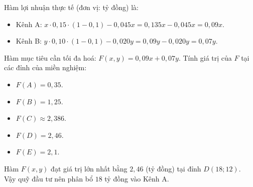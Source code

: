 \begin{ex}
{\begin{center}
\begin{tikzpicture}[line join=round, line cap=round, >=stealth, scale=0.2222]
		\end{tikzpicture}
		\end{center}
		Hàm lợi nhuận thực tế (đơn vị: tỷ đồng) là:
		\begin{itemize}
			\item Kênh A: $x \cdot 0{,}15 \cdot (1 - 0{,}1) - 0{,}045x = 0{,}135x - 0{,}045x = 0{,}09x$.
			\item Kênh B: $y \cdot 0{,}10 \cdot (1 - 0{,}1) - 0{,}020y = 0{,}09y - 0{,}020y = 0{,}07y$.
		\end{itemize}
		Hàm mục tiêu cần tối đa hoá: $F(x,y) = 0{,}09x + 0{,}07y$.
		Tính giá trị của $F$ tại các đỉnh của miền nghiệm:
		\begin{itemize}
			\item $F(A) = 0{,}35$.
			\item $F(B) = 1{,}25$.
			\item $F(C) \approx 2{,}386$.
			\item $F(D) = 2{,}46$.
			\item $F(E) = 2{,}1$.
		\end{itemize}
		Hàm $F(x,y)$ đạt giá trị lớn nhất bằng $2{,}46$ (tỷ đồng) tại đỉnh $D(18; 12)$.\\
		Vậy quỹ đầu tư nên phân bổ $18$ tỷ đồng vào Kênh A.
	}
\end{ex}


